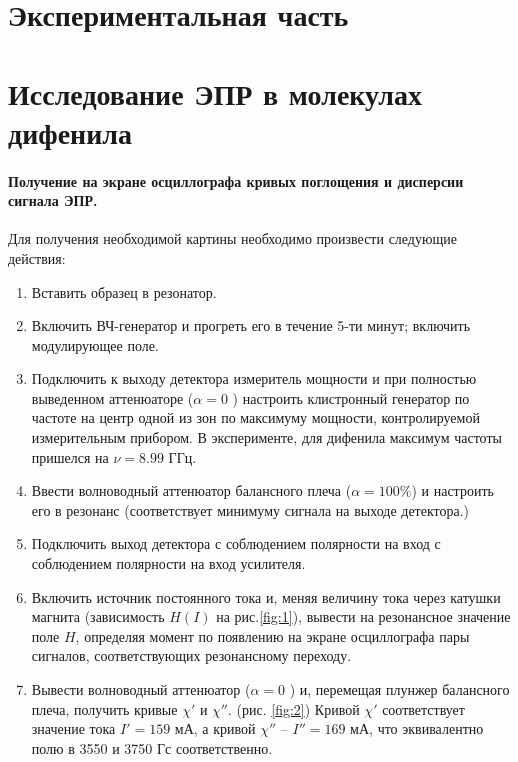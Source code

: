 \section{Экспериментальная часть}%


\section{Исследование ЭПР в молекулах дифенила}%
\paragraph{Получение на экране осциллографа кривых поглощения и дисперсии сигнала ЭПР.}%
\label{par:1}
Для получения необходимой картины необходимо произвести следующие действия:
\begin{enumerate}
    \item Вставить образец в резонатор.
    \item Включить ВЧ-генератор и прогреть его в течение 5-ти минут; включить модулирующее поле.
    \item Подключить к выходу детектора измеритель мощности и при полностью выведенном аттенюаторе ($\alpha = 0$ ) настроить клистронный генератор по частоте
        на центр одной из зон по максимуму мощности, контролируемой измерительным прибором. В эксперименте, для дифенила максимум частоты 
        пришелся на $\nu = 8.99$ ГГц.
    \item Ввести волноводный аттенюатор балансного плеча ($\alpha = 100 \% $) и настроить его в резонанс (соответствует минимуму сигнала на выходе детектора.)
    \item Подключить выход детектора с соблюдением полярности на вход с соблюдением полярности на вход усилителя.
    \item Включить источник постоянного тока и, меняя величину тока через катушки магнита (зависимость $H(I)$ на рис.\ref{fig:1}), вывести на резонансное значение поле $H$, определяя момент по появлению на экране осциллографа 
        пары сигналов, соответствующих резонансному переходу. 

    \item Вывести волноводный аттенюатор ($ \alpha = 0$ ) и, перемещая плунжер балансного плеча, получить кривые $\chi'$ и  $\chi''$. (рис. \ref{fig:2})
     Кривой $\chi'$ соответствует значение тока $I' = 159 $ мА,  а кривой $\chi''$ -- $I'' = 169$ мА, что эквивалентно полю в 3550 и 3750 Гс соответственно.
\end{enumerate}


